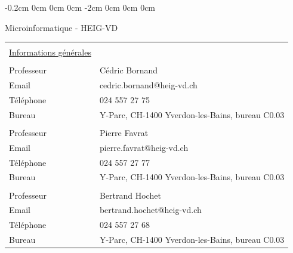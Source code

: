 \documentclass[10pt,a4paper]{book}
\begin{document}

\setlength{\textheight}{24cm}

\changepage{1.5cm}%
           {-0.2cm}%
           {0cm}%
           {0cm}%
           {0cm}%
           {-2cm}%
           {0cm}%
           {0cm}%
           {0cm}%
 \setcounter{page}{1}

\newpage
{} \setcounter{page}{1}


\begin{center}
Microinformatique - HEIG-VD

\end{center}

\begin{tabular}{p{4cm}p{10cm}}
&\\
\underline{Informations générales}& \\
&\\
Professeur & Cédric Bornand\\
Email & cedric.bornand@heig-vd.ch\\
Téléphone & 024 557 27 75 \\
Bureau & Y-Parc, CH-1400 Yverdon-les-Bains, bureau C0.03
\\
\-
\\
Professeur & Pierre Favrat\\
Email & pierre.favrat@heig-vd.ch\\
Téléphone & 024 557 27 77 \\
Bureau & Y-Parc, CH-1400 Yverdon-les-Bains, bureau C0.03
\\
\-
\\
Professeur & Bertrand Hochet\\
Email & bertrand.hochet@heig-vd.ch\\
Téléphone & 024 557 27 68 \\
Bureau & Y-Parc, CH-1400 Yverdon-les-Bains, bureau C0.03
\\
\end{tabular} \\
\end{document}
